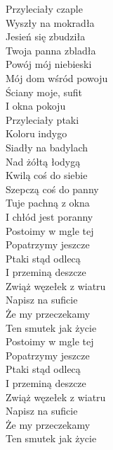 
Przyleciały czaple   \\
Wyszły na mokradła    \\
Jesień się zbudziła  \\
Twoja panna zbladła   \\
Powój mój niebieski   \\
Mój dom wśród powoju   \\
Ściany moje, sufit   \\
I okna pokoju   \tab{} \\
\hops
Przyleciały ptaki  \\
Koloru indygo \\
Siadły na badylach  \\
Nad żółtą łodygą  \\
Kwilą coś do siebie  \\
Szepczą coś do panny  \\
Tuje pachną z okna \\
I chłód jest poranny \\
\hops
Postoimy w mgle tej \\
Popatrzymy jeszcze  \\
Ptaki stąd odlecą  \\
I przeminą deszcze  \\
Zwiąż węzełek z wiatru  \\
Napisz na suficie  \\
Że my przeczekamy  \\
Ten smutek jak życie \\
\hops
Postoimy w mgle tej \\
Popatrzymy jeszcze  \\
Ptaki stąd odlecą  \\
I przeminą deszcze  \\
Zwiąż węzełek z wiatru  \\
Napisz na suficie  \\
Że my przeczekamy \\
Ten smutek jak życie 